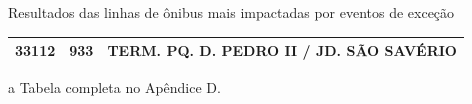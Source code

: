 \documentclass{beamer}
\begin{document}
\begin{frame}{Resultados das linhas de ônibus mais impactadas por eventos de exceção}
\begin {table} [!htb]
\begin{adjustbox}{max height=10mm, width=4in}
\begin{threeparttable}
\begin {tabular} {c|c|c}
    33112 & 933   & TERM. PQ. D. PEDRO II / JD. SÃO SAVÉRIO  \\
%
%
%
%
%
%
%
%
%
%
%
%
%
%
%
%
%
%
\bottomrule
\end{tabular}
\begin{tablenotes}
            \item[a] Tabela completa no Apêndice D.
        \end{tablenotes}
\end{threeparttable}
\end{adjustbox}
\end{table}
\end{frame}
\end{document}
